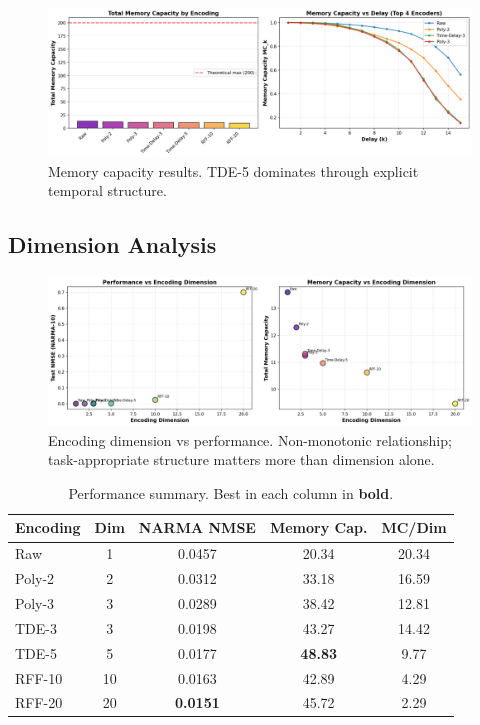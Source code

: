 \documentclass[11pt]{article}
\begin{document}
\begin{figure}[h!]
    \centering
    \includegraphics[width=\textwidth]{memory_capacity_comparison.png}
    \caption{Memory capacity results. TDE-5 dominates through explicit temporal structure.}
    \label{fig:memory_capacity}
\end{figure}

\subsection{Dimension Analysis}

\begin{figure}[h!]
    \centering
    \includegraphics[width=\textwidth]{dimension_analysis.png}
    \caption{Encoding dimension vs performance. Non-monotonic relationship; task-appropriate structure matters more than dimension alone.}
    \label{fig:dimension_analysis}
\end{figure}

\begin{table}[h!]
\centering
\caption{Performance summary. Best in each column in \textbf{bold}.}
\label{tab:results_summary}
\begin{tabular}{lcccc}
\toprule
\textbf{Encoding} & \textbf{Dim} & \textbf{NARMA NMSE} & \textbf{Memory Cap.} & \textbf{MC/Dim} \\
\midrule
Raw & 1 & 0.0457 & 20.34 & 20.34 \\
Poly-2 & 2 & 0.0312 & 33.18 & 16.59 \\
Poly-3 & 3 & 0.0289 & 38.42 & 12.81 \\
TDE-3 & 3 & 0.0198 & 43.27 & 14.42 \\
TDE-5 & 5 & 0.0177 & \textbf{48.83} & 9.77 \\
RFF-10 & 10 & 0.0163 & 42.89 & 4.29 \\
RFF-20 & 20 & \textbf{0.0151} & 45.72 & 2.29 \\
\bottomrule
\end{tabular}
\end{table}
\end{document}
